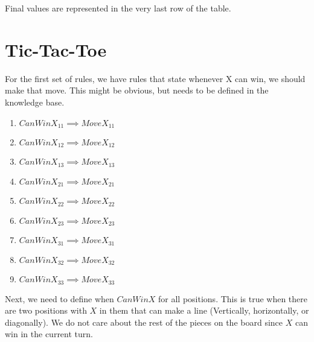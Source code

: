 \documentclass[22pt]{article}
\begin{document}
Final values are represented in the very last row of the table.

\newpage

\section{Tic-Tac-Toe}

For the first set of rules, we have rules that state whenever X
can win, we should make that move. This might be obvious, but 
needs to be defined in the knowledge base.

\begin{multicols}{2}
\begin{enumerate}
	\item $CanWinX_{11} \implies MoveX_{11}$
	\item $CanWinX_{12} \implies MoveX_{12}$
	\item $CanWinX_{13} \implies MoveX_{13}$
	\item $CanWinX_{21} \implies MoveX_{21}$
	\item $CanWinX_{22} \implies MoveX_{22}$
	\item $CanWinX_{23} \implies MoveX_{23}$
	\item $CanWinX_{31} \implies MoveX_{31}$
	\item $CanWinX_{32} \implies MoveX_{32}$
	\item $CanWinX_{33} \implies MoveX_{33}$
\end{enumerate}
\end{multicols}

\noindent Next, we need to define when $CanWinX$ for all positions. This is true 
when there are two positions with $X$ in them that can make a line (Vertically,
horizontally, or diagonally). We do not care about the rest of the pieces on 
the board since $X$ can win in the current turn.
\end{document}
